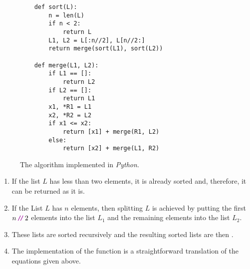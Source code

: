 \begin{figure}[!ht]
  \centering
\begin{verbatim}
    def sort(L):
        n = len(L)
        if n < 2:
            return L
        L1, L2 = L[:n//2], L[n//2:]
        return merge(sort(L1), sort(L2))
    
    def merge(L1, L2):
        if L1 == []:
            return L2
        if L2 == []:
            return L1
        x1, *R1 = L1
        x2, *R2 = L2
        if x1 <= x2:
            return [x1] + merge(R1, L2)
        else:
            return [x2] + merge(L1, R2)
\end{verbatim}
\vspace*{-0.3cm}
  \caption{The  algorithm implemented in \textsl{Python}.}
  \label{fig:merge-sort.stlx}
\end{figure}
\begin{enumerate}
\item If the list $L$ has less than two elements, it is already sorted and, therefore, it
      can be returned as it is.
\item If the List $L$ has $n$ elements, then splitting $L$ is achieved by putting the first $n\dv 2$
      elements into the list $L_1$ and the remaining elements into the list $L_2$.
\item These lists are sorted recursively and the resulting sorted lists are then .
\item The implementation of the function  is a straightforward translation of the equations
      given above.
\end{enumerate}

